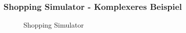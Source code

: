 \subsubsection{Shopping Simulator - Komplexeres Beispiel}


\begin{figure}[H]
	\caption{Shopping Simulator}
\end{figure}


